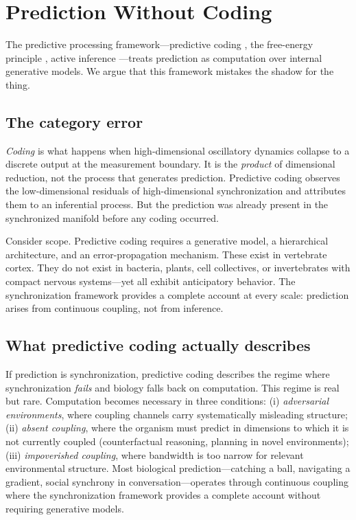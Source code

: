 \documentclass[12pt]{article}
\begin{document}
\section{Prediction Without Coding}
\label{sec:predictive}

The predictive processing framework---predictive coding \cite{rao1999}, the free-energy principle \cite{friston2010}, active inference \cite{friston2017}---treats prediction as computation over internal generative models. We argue that this framework mistakes the shadow for the thing.

\subsection{The category error}

\textit{Coding} is what happens when high-dimensional oscillatory dynamics collapse to a discrete output at the measurement boundary. It is the \textit{product} of dimensional reduction, not the process that generates prediction. Predictive coding observes the low-dimensional residuals of high-dimensional synchronization and attributes them to an inferential process. But the prediction was already present in the synchronized manifold before any coding occurred.

Consider scope. Predictive coding requires a generative model, a hierarchical architecture, and an error-propagation mechanism. These exist in vertebrate cortex. They do not exist in bacteria, plants, cell collectives, or invertebrates with compact nervous systems---yet all exhibit anticipatory behavior. The synchronization framework provides a complete account at every scale: prediction arises from continuous coupling, not from inference.

\subsection{What predictive coding actually describes}

If prediction is synchronization, predictive coding describes the regime where synchronization \textit{fails} and biology falls back on computation. This regime is real but rare. Computation becomes necessary in three conditions: (i) \textit{adversarial environments}, where coupling channels carry systematically misleading structure; (ii) \textit{absent coupling}, where the organism must predict in dimensions to which it is not currently coupled (counterfactual reasoning, planning in novel environments); (iii) \textit{impoverished coupling}, where bandwidth is too narrow for relevant environmental structure. Most biological prediction---catching a ball, navigating a gradient, social synchrony in conversation---operates through continuous coupling where the synchronization framework provides a complete account without requiring generative models.
\end{document}
